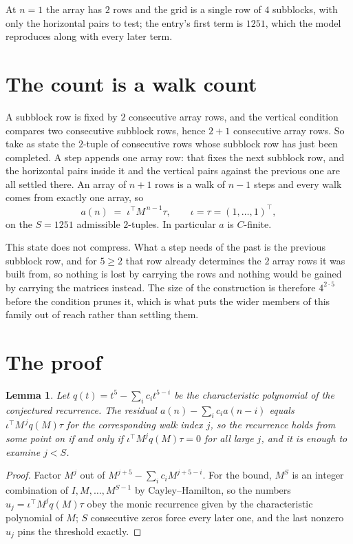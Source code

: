 \documentclass[11pt,a4paper]{article}
\theoremstyle{plain}
\newtheorem{lemma}[theorem]{Lemma}
\theoremstyle{definition}
\begin{document}
At $n=1$ the array has $2$ rows and the grid is a single row of $4$
subblocks, with only the horizontal pairs to test; the entry's first term is
$1251$, which the model reproduces along with every later term.

\section{The count is a walk count}

A subblock row is fixed by $2$ consecutive array rows, and the vertical condition compares
two consecutive subblock rows, hence $2+1$ consecutive array rows. So take as state the
$2$-tuple of consecutive rows whose subblock row has just been completed. A step appends one
array row: that fixes the next subblock row, and the horizontal pairs inside it and the
vertical pairs against the previous one are all settled there. An array of $n+1$ rows is
a walk of $n-1$ steps and every walk comes from exactly one array, so
\[
a(n)\;=\;\iota^{\!\top}M^{\,n-1}\tau,\qquad\iota=\tau=(1,\dots,1)^{\!\top},
\]
on the $S=1251$ admissible $2$-tuples. In particular $a$ is $C$-finite.

This state does not compress. What a step needs of the past is the previous subblock row, and
for $5\ge2$ that row already determines the $2$ array rows it was built from, so nothing
is lost by carrying the rows and nothing would be gained by carrying the matrices instead. The
size of the construction is therefore $4^{2\cdot5}$ before the condition prunes
it, which is what puts the wider members of this family out of reach rather than settling them.

\section{The proof}

\begin{lemma}\label{lem:crit}
Let $q(t)=t^{5}-\sum_i c_it^{5-i}$ be the characteristic polynomial of the
conjectured recurrence. The residual $a(n)-\sum_ic_ia(n-i)$ equals
$\iota^{\!\top}M^{\,j}q(M)\tau$ for the corresponding walk index $j$, so the recurrence
holds from some point on if and only if $\iota^{\!\top}M^{j}q(M)\tau=0$ for all large $j$,
and it is enough to examine $j<S$.
\end{lemma}

\begin{proof}
Factor $M^{j}$ out of $M^{j+5}-\sum_ic_iM^{j+5-i}$. For the bound, $M^{S}$
is an integer combination of $I,M,\dots,M^{S-1}$ by Cayley--Hamilton, so the numbers
$u_j=\iota^{\!\top}M^{j}q(M)\tau$ obey the monic recurrence given by the characteristic
polynomial of $M$; $S$ consecutive zeros force every later one, and the last nonzero $u_j$
pins the threshold exactly.
\end{proof}
\end{document}
